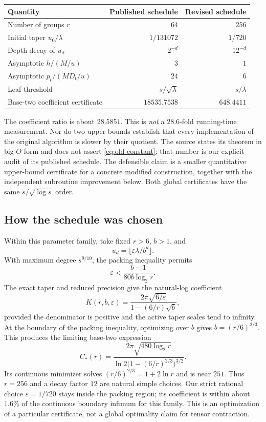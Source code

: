\documentclass[11pt]{article}
\theoremstyle{remark}
\begin{document}
\begin{center}
\begin{tabular}{lrr}
\toprule
Quantity & Published schedule & Revised schedule\\
\midrule
Number of groups $r$ & $64$ & $256$\\
Initial taper $u_0/\lambda$ & $1/131072$ & $1/720$\\
Depth decay of $u_d$ & $2^{-d}$ & $12^{-d}$\\
Asymptotic $h/(M/u)$ & $3$ & $1$\\
Asymptotic $p_t/(MD_t/u)$ & $24$ & $6$\\
Leaf threshold & $s/\sqrt\lambda$ & $s/\lambda$\\
Base-two coefficient certificate & $18535.7538$ & $648.4411$\\
\bottomrule
\end{tabular}
\end{center}

The coefficient ratio is about $28.5851$. This is \emph{not} a $28.6$-fold running-time measurement. Nor do two upper bounds establish that every implementation of the original algorithm is slower by their quotient. The source states its theorem in big-$O$ form and does not assert \eqref{eq:old-constant}; that number is our explicit audit of its published schedule. The defensible claim is a smaller quantitative upper-bound certificate for a concrete modified construction, together with the independent subroutine improvement below. Both global certificates have the same $s/\sqrt{\log s}$ order.

\subsection{How the schedule was chosen}

Within this parameter family, take fixed $r>6$, $b>1$, and
\[
 u_d=\lfloor\varepsilon\lambda/b^d\rfloor.
\]
With maximum degree $s^{9/10}$, the packing inequality permits
\[
 \varepsilon<\frac{b-1}{80b\log_2r}.
\]
The exact taper and reduced precision give the natural-log coefficient
\[
 K(r,b,\varepsilon)=
 \frac{2\pi\sqrt{6/\varepsilon}}{1-(6/r)\sqrt b},
\]
provided the denominator is positive and the active taper scales tend to infinity. At the boundary of the packing inequality, optimizing over $b$ gives $b=(r/6)^{2/3}$. This produces the limiting base-two expression
\[
 C_*(r)=\frac{2\pi\sqrt{480\log_2r}}
 {\ln2\bigl(1-(6/r)^{2/3}\bigr)^{3/2}}.
\]
Its continuous minimizer solves $(r/6)^{2/3}=1+2\ln r$ and is near $251$. Thus $r=256$ and a decay factor $12$ are natural simple choices. Our strict rational choice $\varepsilon=1/720$ stays inside the packing region; its coefficient is within about $1.6\%$ of the continuous boundary infimum for this family. This is an optimization of a particular certificate, not a global optimality claim for tensor contraction.
\end{document}
